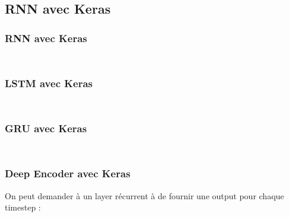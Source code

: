 \subsection{RNN avec Keras}

\begin{frame}
  \frametitle{RNN avec Keras}
  \inputminted[linenos,fontsize=\small,bgcolor=pythonbg]{python}{code/tf-keras-rnn.py}
  \inputminted[linenos,fontsize=\small,bgcolor=returnbg]{python}{code/tf-keras-rnn.txt}
\end{frame}

\begin{frame}
  \frametitle{LSTM avec Keras}
  \inputminted[linenos,fontsize=\small,bgcolor=pythonbg]{python}{code/tf-keras-lstm.py}
  \inputminted[linenos,fontsize=\small,bgcolor=returnbg]{python}{code/tf-keras-lstm.txt}
\end{frame}

\begin{frame}
  \frametitle{GRU avec Keras}
  \inputminted[linenos,fontsize=\small,bgcolor=pythonbg]{python}{code/tf-keras-gru.py}
  \inputminted[linenos,fontsize=\small,bgcolor=returnbg]{python}{code/tf-keras-gru.txt}
\end{frame}

\begin{frame}
  \frametitle{Deep Encoder avec Keras}
  On peut demander à un layer récurrent à de fournir une output pour chaque timestep :
  \inputminted[linenos,fontsize=\small,bgcolor=pythonbg]{python}{code/tf-keras-rnn-all-timestep.py}
  \inputminted[linenos,fontsize=\small,bgcolor=returnbg]{python}{code/tf-keras-gru.txt}
\end{frame}

